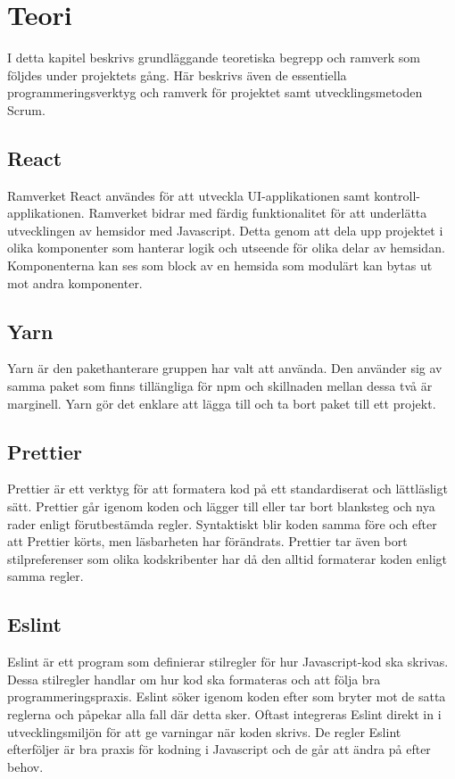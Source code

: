 \chapter{Teori}
\label{cha:theory}
I detta kapitel beskrivs grundläggande teoretiska begrepp och ramverk som följdes under projektets gång. Här beskrivs även de essentiella programmeringsverktyg och ramverk för projektet samt utvecklingsmetoden Scrum.

\section{React}
Ramverket React användes för att utveckla UI-applikationen samt kontroll-applikationen. Ramverket bidrar med färdig funktionalitet för att underlätta utvecklingen av hemsidor med Javascript. Detta genom att dela upp projektet i olika komponenter som hanterar logik och utseende för olika delar av hemsidan. Komponenterna kan ses som block av en hemsida som modulärt kan bytas ut mot andra komponenter.~\cite{React}

\section{Yarn}
Yarn är den pakethanterare gruppen har valt att använda. Den använder sig av samma paket som finns tillängliga för npm och skillnaden mellan dessa två är marginell. Yarn gör det enklare att lägga till och ta bort paket till ett projekt.~\cite{Yarn}

\section{Prettier}
Prettier är ett verktyg för att formatera kod på ett standardiserat och lättläsligt sätt. Prettier går igenom koden och lägger till eller tar bort blanksteg och nya rader enligt förutbestämda regler. Syntaktiskt blir koden samma före och efter att Prettier körts, men läsbarheten har förändrats. Prettier tar även bort stilpreferenser som olika kodskribenter har då den alltid formaterar koden enligt samma regler.~\cite{prettier}


\section{Eslint}
Eslint är ett program som definierar stilregler för hur Javascript-kod ska skrivas. Dessa stilregler handlar om hur kod ska formateras och att följa bra programmeringspraxis. Eslint söker igenom koden efter som bryter mot de satta reglerna och påpekar alla fall där detta sker. Oftast integreras Eslint direkt in i utvecklingsmiljön för att ge varningar när koden skrivs. De regler Eslint efterföljer är bra praxis för kodning i Javascript och de går att ändra på efter behov.~\cite{eslint}


